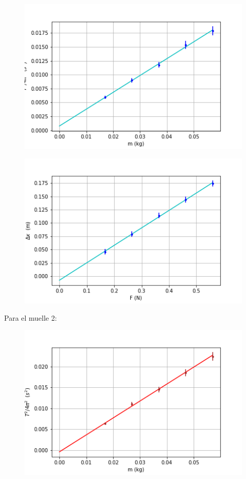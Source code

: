 \documentclass[12pt,a4paper]{article}
\begin{document}
\begin{figure}[h!] \centering
\includegraphics[scale=0.7]{plot1.png}
\end{figure}

\begin{figure}[h!] \centering
\includegraphics[scale=0.68]{plot2.png}
\end{figure}

\newpage

Para el muelle 2:

\begin{figure}[h!] \centering
\includegraphics[scale=0.68]{plot3.png}
\end{figure}
\end{document}
